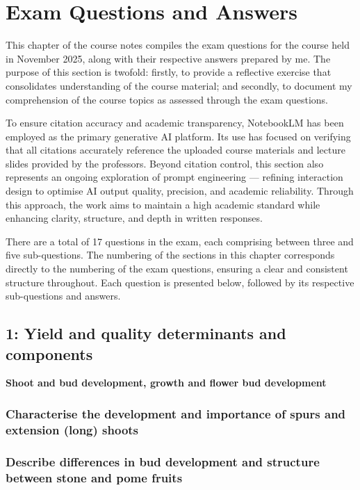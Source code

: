 \chapter{Exam Questions and Answers}
\setlength{\headheight}{12.71342pt}
\addtolength{\topmargin}{-0.71342pt}

This chapter of the course notes compiles the exam questions for the course held in November 2025, along with their respective answers prepared by me. The purpose of this section is twofold: firstly, to provide a reflective exercise that consolidates understanding of the course material; and secondly, to document my comprehension of the course topics as assessed through the exam questions.

\vspace{1em}
To ensure citation accuracy and academic transparency, NotebookLM has been employed as the primary generative AI platform. Its use has focused on verifying that all citations accurately reference the uploaded course materials and lecture slides provided by the professors. Beyond citation control, this section also represents an ongoing exploration of prompt engineering — refining interaction design to optimise AI output quality, precision, and academic reliability. Through this approach, the work aims to maintain a high academic standard while enhancing clarity, structure, and depth in written responses.

\vspace{1em}
There are a total of 17 questions in the exam, each comprising between three and five sub-questions. The numbering of the sections in this chapter corresponds directly to the numbering of the exam questions, ensuring a clear and consistent structure throughout. Each question is presented below, followed by its respective sub-questions and answers.

\section{1: Yield and quality determinants and components}
\textbf{Shoot and bud development, growth and flower bud development}

\subsection{Characterise the development and importance of spurs and extension 
(long) shoots}
\subsection{Describe differences in bud development and structure between stone 
and pome fruits}
